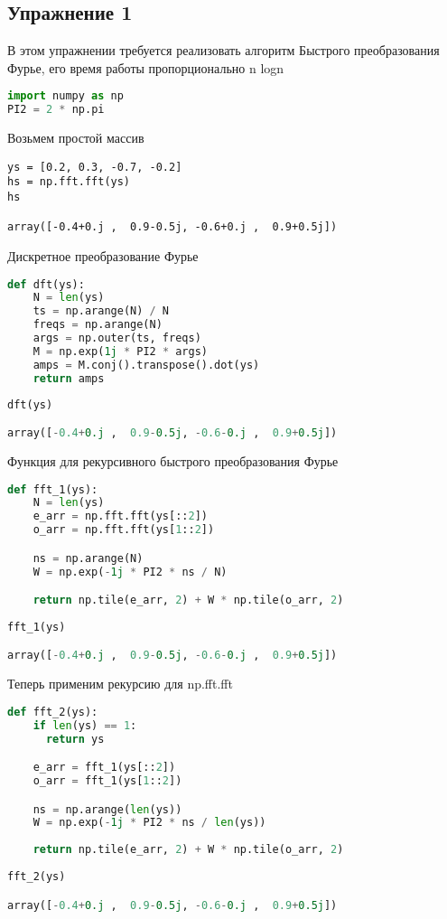 \subsection{Упражнение 1}

В этом упражнении требуется реализовать алгоритм Быстрого преобразования Фурье, его время работы пропорционально n logn

\begin{lstlisting}[language=Python]
import numpy as np
PI2 = 2 * np.pi
\end{lstlisting}

Возьмем простой массив

\begin{lstlisting}
ys = [0.2, 0.3, -0.7, -0.2]
hs = np.fft.fft(ys)
hs

array([-0.4+0.j ,  0.9-0.5j, -0.6+0.j ,  0.9+0.5j])
\end{lstlisting}

Дискретное преобразование Фурье

\begin{lstlisting}[language=Python]
def dft(ys):
    N = len(ys)
    ts = np.arange(N) / N
    freqs = np.arange(N)
    args = np.outer(ts, freqs)
    M = np.exp(1j * PI2 * args)
    amps = M.conj().transpose().dot(ys)
    return amps
\end{lstlisting}

\begin{lstlisting}[language=Python]
dft(ys)

array([-0.4+0.j ,  0.9-0.5j, -0.6-0.j ,  0.9+0.5j])
\end{lstlisting}

Функция для рекурсивного быстрого преобразования Фурье

\begin{lstlisting}[language=Python]
def fft_1(ys):
    N = len(ys)
    e_arr = np.fft.fft(ys[::2])
    o_arr = np.fft.fft(ys[1::2])

    ns = np.arange(N)
    W = np.exp(-1j * PI2 * ns / N)

    return np.tile(e_arr, 2) + W * np.tile(o_arr, 2)
    
fft_1(ys)

array([-0.4+0.j ,  0.9-0.5j, -0.6-0.j ,  0.9+0.5j])
\end{lstlisting}

Теперь применим рекурсию для np.fft.fft

\begin{lstlisting}[language=Python]
def fft_2(ys):
    if len(ys) == 1:
      return ys

    e_arr = fft_1(ys[::2])
    o_arr = fft_1(ys[1::2])

    ns = np.arange(len(ys))
    W = np.exp(-1j * PI2 * ns / len(ys))
    
    return np.tile(e_arr, 2) + W * np.tile(o_arr, 2)
    
fft_2(ys)

array([-0.4+0.j ,  0.9-0.5j, -0.6-0.j ,  0.9+0.5j])
\end{lstlisting}

